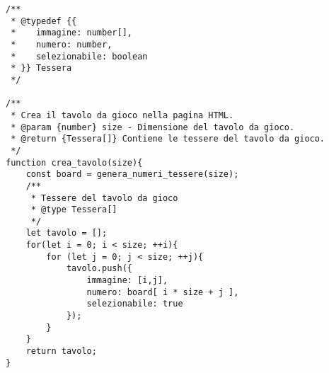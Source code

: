 \begin{frame}[fragile]\transfade
  \begin{sol}\centering
      \begin{verbatim}
/**
 * @typedef {{
 *    immagine: number[],
 *    numero: number,
 *    selezionabile: boolean
 * }} Tessera
 */

/**
 * Crea il tavolo da gioco nella pagina HTML.
 * @param {number} size - Dimensione del tavolo da gioco.
 * @return {Tessera[]} Contiene le tessere del tavolo da gioco.
 */
function crea_tavolo(size){
    const board = genera_numeri_tessere(size);
    /**
     * Tessere del tavolo da gioco
     * @type Tessera[]
     */
    let tavolo = [];
    for(let i = 0; i < size; ++i){
        for (let j = 0; j < size; ++j){
            tavolo.push({
                immagine: [i,j],
                numero: board[ i * size + j ],
                selezionabile: true
            });
        }
    }
    return tavolo;
}
      \end{verbatim}
  \end{sol}
\end{frame}